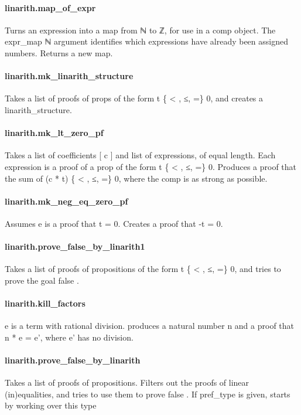 \documentclass{article}
\begin{document}
\paragraph{linarith.map\_of\_expr}
\par
Turns an expression into a map from ℕ to ℤ, for use in a comp object.
The expr\_map ℕ argument identifies which expressions have already been assigned numbers.
Returns a new map.
\paragraph{linarith.mk\_linarith\_structure}
\par
Takes a list of proofs of props of the form t \{
<
, ≤, =\} 0, and creates a linarith\_structure.
\paragraph{linarith.mk\_lt\_zero\_pf}
\par
Takes a list of coefficients 
{[}
c
{]}
 and list of expressions, of equal length.
Each expression is a proof of a prop of the form t \{
<
, ≤, =\} 0.
Produces a proof that the sum of (c
*
t) \{
<
, ≤, =\} 0, where the comp is as strong as possible.
\paragraph{linarith.mk\_neg\_eq\_zero\_pf}
\par
Assumes e is a proof that t = 0. Creates a proof that -t = 0.
\paragraph{linarith.prove\_false\_by\_linarith1}
\par
Takes a list of proofs of propositions of the form t \{
<
, ≤, =\} 0,
and tries to prove the goal 
\colorbox[RGB]{253,246,227}{{{{\color[RGB]{101, 123, 131} false }}}}.
\paragraph{linarith.kill\_factors}
\par
e is a term with rational division. produces a natural number n and a proof that n
*
e = e',
where e' has no division.
\paragraph{linarith.prove\_false\_by\_linarith}
\par
Takes a list of proofs of propositions.
Filters out the proofs of linear (in)equalities,
and tries to use them to prove 
\colorbox[RGB]{253,246,227}{{{{\color[RGB]{101, 123, 131} false }}}}.
If pref\_type is given, starts by working over this type
\end{document}
